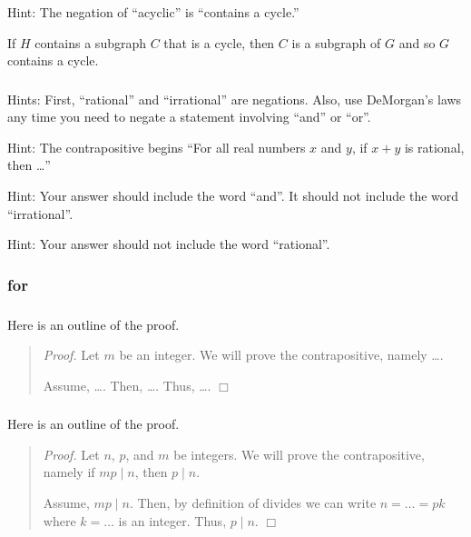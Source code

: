 \subsubsection*{ \answers}
\begin{apart}
    \item Hint: The negation of ``acyclic'' is ``contains a cycle.''
    \item If $H$ contains a subgraph $C$ that is a cycle, then $C$ is a subgraph of $G$ and so $G$ contains a cycle.
\end{apart}

\subsubsection*{ \answers}
Hints: First, ``rational'' and ``irrational'' are negations. Also, use DeMorgan's laws any time you need to negate a statement involving ``and'' or ``or''.
\begin{apart}
    \item Hint: The contrapositive begins ``For all real numbers $x$ and $y$, if $x+y$ is rational, then \ldots''
    \item Hint: Your answer should include the word ``and''.  It should not include the word ``irrational''.
    \item Hint: Your answer should not include the word ``rational''.
\end{apart}

\subsubsection{\answers for  \subpffcp}

\subsubsection*{ \answers}
Here is an outline of the proof.
    \begin{quote}
        \emph{Proof.} Let $m$ be an integer.  We will prove the contrapositive, namely \ldots.

        Assume, \ldots.  Then, \ldots.  Thus, \ldots. \hfill $\Box$      
    \end{quote}

\subsubsection*{ \answers}
Here is an outline of the proof.
    \begin{quote}
        \emph{Proof.} Let $n$, $p$, and $m$ be integers.  We will prove the contrapositive, namely if $mp \mid n$, then $p \mid n$.

        Assume, $mp \mid n$.  Then, by definition of divides we can write $n= \ldots = pk$ where $k=\ldots$ is an integer.  Thus, $p \mid n$. \hfill $\Box$      
    \end{quote}

